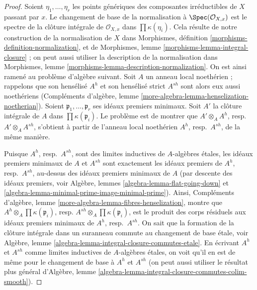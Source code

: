 \begin{proof}
Soient $\eta_1, \ldots, \eta_r$ les points génériques des composantes
irréductibles de $X$ passant par $x$. Le changement de base de la normalisation à
$\Spec(\mathcal{O}_{X, x})$ est le spectre de la
clôture intégrale de $\mathcal{O}_{X, x}$ dans $\prod \kappa(\eta_i)$.
Cela résulte de notre construction de la normalisation de $X$ dans
Morphismes, définition \ref{morphisms-definition-normalization},
et de Morphismes, lemme \ref{morphisms-lemma-integral-closure} ;
on peut aussi utiliser la description de la normalisation
dans Morphismes, lemme \ref{morphisms-lemma-description-normalization}.
On est ainsi ramené au problème d'algèbre suivant.
Soit $A$ un anneau local noethérien ; rappelons que son
hensélisé $A^h$ et son hensélisé strict $A^{sh}$
sont alors eux aussi noethériens (Compléments d'algèbre, lemme
\ref{more-algebra-lemma-henselization-noetherian}).
Soient $\mathfrak p_1, \ldots, \mathfrak p_r$
ses idéaux premiers minimaux. Soit $A'$ la clôture intégrale
de $A$ dans $\prod \kappa(\mathfrak p_i)$.
Le problème est de montrer que
$A' \otimes_A A^h$, resp.\ $A' \otimes_A A^{sh}$, s'obtient
à partir de l'anneau local noethérien $A^h$, resp.\ $A^{sh}$,
de la même manière.

\medskip\noindent
Puisque $A^h$, resp.\ $A^{sh}$, sont des limites inductives de $A$-algèbres étales,
les idéaux premiers minimaux de $A$ et $A^{sh}$ sont exactement
les idéaux premiers de $A^h$, resp.\ $A^{sh}$, au-dessus des idéaux premiers minimaux
de $A$ (par descente des idéaux premiers, voir
Algèbre, lemmes \ref{algebra-lemma-flat-going-down} et
\ref{algebra-lemma-minimal-prime-image-minimal-prime}).
Ainsi, Compléments d'algèbre, lemme \ref{more-algebra-lemma-fibres-henselization},
montre que
$A^h \otimes_A \prod \kappa(\mathfrak p_i)$,
resp.
$A^{sh} \otimes_A \prod \kappa(\mathfrak p_i)$,
est le produit des corps résiduels aux idéaux premiers minimaux
de $A^h$, resp.\ $A^{sh}$. On sait que la formation de la
clôture intégrale dans un suranneau commute au changement de base
étale, voir
Algèbre, lemme \ref{algebra-lemma-integral-closure-commutes-etale}.
En écrivant $A^h$ et $A^{sh}$ comme limites inductives de $A$-algèbres étales,
on voit qu'il en est de même pour le changement de base à
$A^h$ et $A^{sh}$ (on peut aussi utiliser le résultat plus général
d'Algèbre, lemme \ref{algebra-lemma-integral-closure-commutes-colim-smooth}).
\end{proof}








